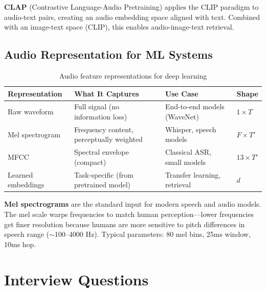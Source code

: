 \textbf{CLAP} (Contrastive Language-Audio Pretraining) applies the CLIP paradigm to audio-text pairs, creating an audio embedding space aligned with text. Combined with an image-text space (CLIP), this enables audio-image-text retrieval.

\subsection{Audio Representation for ML Systems}

\begin{table}[H]
\centering
\caption{Audio feature representations for deep learning}
\begin{tabularx}{\textwidth}{lXXl}
\toprule
\textbf{Representation} & \textbf{What It Captures} & \textbf{Use Case} & \textbf{Shape} \\
\midrule
Raw waveform & Full signal (no information loss) & End-to-end models (WaveNet) & $1 \times T$ \\
Mel spectrogram & Frequency content, perceptually weighted & Whisper, speech models & $F \times T'$ \\
MFCC & Spectral envelope (compact) & Classical ASR, small models & $13 \times T'$ \\
Learned embeddings & Task-specific (from pretrained model) & Transfer learning, retrieval & $d$ \\
\bottomrule
\end{tabularx}
\end{table}

\textbf{Mel spectrograms} are the standard input for modern speech and audio models. The mel scale warps frequencies to match human perception---lower frequencies get finer resolution because humans are more sensitive to pitch differences in speech range ($\sim$100--4000 Hz). Typical parameters: 80 mel bins, 25ms window, 10ms hop.

\section{Interview Questions}
\label{sec:multimodal_interview}


